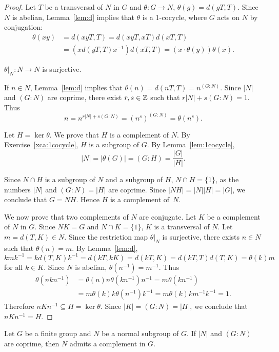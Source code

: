 \begin{proof}
	Let $T$ be a transversal of $N$ in $G$ and $\theta\colon G\to N$,
	$\theta(g)=d(gT,T)$. Since $N$ is abelian, Lemma~\ref{lem:d} implies that 
	$\theta$ is a 1-cocycle, where $G$ acts on $N$ by conjugation: 
	\begin{align*}
		\theta(xy)&=d(xyT,T)
		=d(xyT,xT)d(xT,T)\\
		&=(xd(yT,T)x^{-1})d(xT,T)=(x\cdot\theta(y))\theta(x).
	\end{align*}

	\begin{claim}
		$\theta|_N\colon N\to N$ is surjective. 
	\end{claim}

	If $n\in N$, Lemma~\ref{lem:d} implies that 
	$\theta(n)=d(nT,T)=n^{(G:N)}$. Since $|N|$ and $(G:N)$ are coprime, 
	there exist $r,s\in\mathbb{Z}$ such that $r|N|+s(G:N)=1$. Thus 
	\[
		n=n^{r|N|+s(G:N)}=(n^s)^{(G:N)}=\theta(n^s).
	\]

	Let $H=\ker\theta$. We prove that $H$ is a complement of $N$. 
	By Exercise~\ref{xca:1cocycle}, $H$ is a subgroup of $G$. By Lemma~\ref{lem:1cocycle}, 
	\[
		|N|=|\theta(G)|=(G:H)=\frac{|G|}{|H|}. 
	\]
	
	Since $N\cap H$ is a subgroup of $N$ and a subgroup of $H$, $N\cap H=\{1\}$, as the numbers 
	$|N|$ and $(G:N)=|H|$ are coprime. Since $|NH|=|N||H|=|G|$, we conclude that 
	$G=NH$. Hence $H$ is a complement of~$N$. 

	We now prove that two complements of $N$ are conjugate. 
	Let $K$ be a complement of $N$ in $G$. Since $NK=G$ and $N\cap K=\{1\}$, $K$ is a transversal of $N$. 
 Let $m=d(T,K)\in N$. Since the restriction map $\theta|_N$ is surjective, 
	there exists $n\in N$ such that $\theta(n)=m$. By Lemma~\ref{lem:d}, 
	\[
	kmk^{-1}=kd(T,K)k^{-1}=d(kT,kK)=d(kT,K)=d(kT,T)d(T,K)=\theta(k)m
	\]
    for all $k\in K$. 
	Since $N$ is abelian,
	$\theta(n^{-1})=m^{-1}$. Thus 
	\begin{align*}
		\theta(nkn^{-1})&=\theta(n)n\theta(kn^{-1})n^{-1}
		=m\theta(kn^{-1})\\
		&=m\theta(k)k\theta(n^{-1})k^{-1}
		=m\theta(k)km^{-1}k^{-1}=1.
	\end{align*}
	Therefore $nKn^{-1}\subseteq H=\ker\theta$. Since 
	$|K|=(G:N)=|H|$, we conclude that $nKn^{-1}=H$.
\end{proof}


\begin{theorem}
	\label{thm:SchurZassenhaus}
	Let $G$ be a finite group and $N$ be a normal subgroup of $G$. If $|N|$ and 
	$(G:N)$ are coprime, then $N$ admits a complement in $G$. 
\end{theorem}

